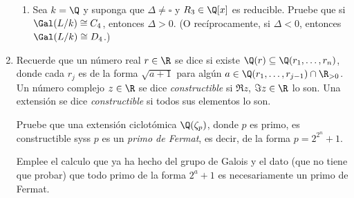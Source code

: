 \documentclass[11pt, reqno]{amsart}
\begin{document}
\begin{enumerate}
\begin{enumerate}
			\item Sea $k = \Q$ y suponga que $\Delta \ne \square$ y $R_3 \in \Q[x]$ es reducible.
				Pruebe que si $\Gal(L/k) \cong C_4$, entonces $\Delta > 0$.
				(O recíprocamente, si $\Delta < 0$, entonces $\Gal(L/k) \cong D_4$.)
		\end{enumerate}
		\nocite{conrad:cubic_quartic_nochar2}

	\item Recuerde que un número real $r \in \R$ se dice  si existe $\Q(r) \subseteq \Q(r_1,
		\dots, r_n)$, donde cada $r_j$ es de la forma $\sqrt{a + 1}$ para algún $a \in \Q(r_1, \dots, r_{j-1}) \cap \R_{>0}$.
		Un número complejo $z \in \R$ se dice \emph{constructible} si $\Re z$, $\Im z \in \R$ lo son.
		Una extensión se dice \emph{constructible} si todos sus elementos lo son.

		Pruebe que una extensión ciclotómica $\Q(\zeta_p)$, donde $p$ es primo, es constructible syss $p$ es un \emph{primo de
		Fermat}, es decir, de la forma $p = 2^{2^n} + 1$.
		\begin{hint}
			Emplee el calculo que ya ha hecho del grupo de Galois y el dato (que no tiene que probar) que todo primo de la forma
			$2^a + 1$ es necesariamente un primo de Fermat.
		\end{hint}
		\nocite{jacobson:basic}


\end{enumerate}
\end{document}
